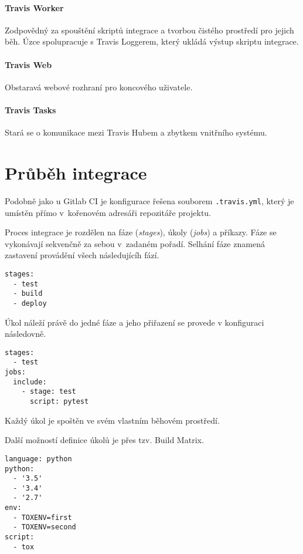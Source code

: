 \paragraph{Travis Worker}

Zodpovědný za spouštění skriptů integrace a tvorbou čistého prostředí pro jejich běh.
Úzce spolupracuje s Travis Loggerem, který ukládá výstup skriptu integrace.

\paragraph{Travis Web}

Obstaravá webové rozhraní pro koncového uživatele.

\paragraph{Travis Tasks}

Stará se o komunikace mezi Travis Hubem a zbytkem vnitřního systému.

\section{Průběh integrace}

Podobně jako u Gitlab CI je konfigurace řešena souborem \verb|.travis.yml|, který je umístěn přímo v~kořenovém adresáři repozitáře projektu.

Proces integrace je rozdělen na fáze (\textit{stages}), úkoly (\textit{jobs}) a příkazy.
Fáze se vykonávají sekvenčně za sebou v~zadaném pořadí.
Selhání fáze znamená zastavení provádění všech následujícíh fází.

\begin{verbatim}
stages:
  - test
  - build
  - deploy
\end{verbatim}

Úkol náleží právě do jedné fáze a jeho přiřazení se provede v konfiguraci následovně.

\begin{verbatim}
stages:
  - test
jobs:
  include:
    - stage: test
      script: pytest
\end{verbatim}

Každý úkol je spoštěn ve svém vlastním běhovém prostředí.

Další možností definice úkolů je přes tzv. Build Matrix.

\begin{verbatim}
language: python
python:
  - '3.5'
  - '3.4'
  - '2.7'
env:
  - TOXENV=first
  - TOXENV=second
script:
  - tox
\end{verbatim}

